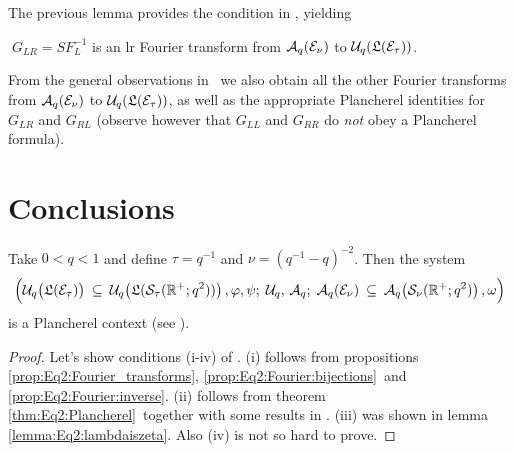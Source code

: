 The previous lemma provides the condition in
\mbox{\cite[proposition 2.4.2]{Jeroen:QE2:haar}}, yielding

\begin{prop} \label{prop:Eq2:Fourier:inverse}
$\;G_{LR}=S F_{L}^{-1}$ is an {\sc lr} Fourier transform from
${\mathcal A}_q(\mathcal E_\nu)$ to ${\mathcal U}_q\!\left(\mathfrak{L}(\mathcal E_\tau)\right)$.
\end{prop}

From the general observations in \mbox{\cite{Jeroen:QE2:haar}}\
we also obtain all the other Fourier transforms from ${\mathcal A}_q(\mathcal E_\nu)$ to
${\mathcal U}_q\!\left(\mathfrak{L}(\mathcal E_\tau)\right)$, as well as the appropriate Plancherel
identities for $G_{LR}$ and $G_{RL}$ (observe however that $G_{LL}$ and $G_{RR}$
do {\em not\/} obey a Plancherel formula).


\section{Conclusions}

\begin{thm}
Take $0<q<1$ and define $\tau = q^{-1}$ and $\nu = (q^{-1}-q)^{-2}$.
Then the system
$$\left( \Uq\!\left(\calL(\Hcore_\tau)\vertM\right) \: \subseteq\:
         \Uq\!\left(\calL({\mathcal S}_\tau(\RR^+;q^2)) \vertM \right),
                \varphi, \psi;\;    \Uq,\,\Aq;\;
                \Aq(\Hcore_\nu)\: \subseteq\:
         \Aq\!\left({\mathcal S}_\nu(\RR^+;q^2)\vertM \right),
          \omega \vertL \right)$$
is a Plancherel context (see \cite{Jeroen:QE2:haar}).
\end{thm}
\begin{proof}
Let's show conditions (i-iv) of \cite[definition 2.5.5]{Jeroen:QE2:haar}\@.
(i) follows from propositions
\ref{prop:Eq2:Fourier_transforms},
\ref{prop:Eq2:Fourier:bijections}\ and \ref{prop:Eq2:Fourier:inverse}\@.
(ii) follows from theorem \ref{thm:Eq2:Plancherel}\ together with some results in
\cite{Jeroen:QE2:haar}\@. (iii) was shown in lemma \ref{lemma:Eq2:lambdaiszeta}\@.
Also (iv) is not so hard to prove.
\end{proof}



